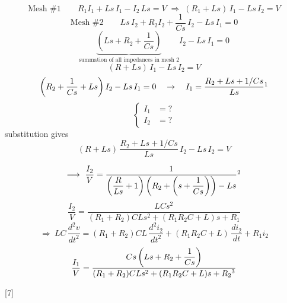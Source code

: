 \documentclass[11pt,a4paper]{article}
\begin{document}
\[
\text{Mesh \#1}\qquad R_1 I_1 + Ls\,I_1 - I_2\,Ls = V \;\Rightarrow\; (R_1 + Ls)\,I_1 - Ls\,I_2 = V
\]
\[
\text{Mesh \#2}\qquad Ls\,I_2 + R_2 I_2 + \frac{1}{Cs}\,I_2 - Ls\,I_1 = 0
\]
\[
\underbrace{\left(Ls + R_2 + \frac{1}{Cs}\right)}_{\text{summation of all impedances in mesh 2}} I_2 - Ls\,I_1 = 0
\]
\[
(R + Ls)\,I_1 - Ls\,I_2 = V
\]
\[
\left(R_2 + \frac{1}{Cs} + Ls\right) I_2 - Ls\,I_1 = 0
\quad\rightarrow\quad
I_1 = \frac{R_2 + Ls + 1/Cs}{Ls}\footnotemark
\]
\[
\left\{\begin{aligned}
I_1 &= ?\\
I_2 &= ?
\end{aligned}\right.
\]
\noindent substitution gives
\[
(R + Ls)\,\frac{R_2 + Ls + 1/Cs}{Ls}\,I_2 - Ls\,I_2 = V
\]

\[
\longrightarrow\ \frac{I_2}{V} = \frac{1}{\left(\dfrac{R}{Ls} + 1\right)\left(R_2 + \left(s + \dfrac{1}{Cs}\right)\right) - Ls}\footnotemark
\]
\[
\frac{I_2}{V} = \frac{LCs^{2}}{(R_1 + R_2)CLs^{2} + (R_1R_2C + L)s + R_1}
\]
\[
\Rightarrow\ LC\,\frac{d^{2}v}{dt^{2}} = (R_1 + R_2)CL\,\frac{d^{2}i_2}{dt^{2}} + (R_1R_2C + L)\,\frac{di_2}{dt} + R_1 i_2
\]
\[
\frac{I_1}{V} = \frac{Cs\left(Ls + R_2 + \dfrac{1}{Cs}\right)}{(R_1 + R_2)CLs^{2} + (R_1R_2C + L)s + R_2\footnotemark}
\]

[7]
\end{document}
